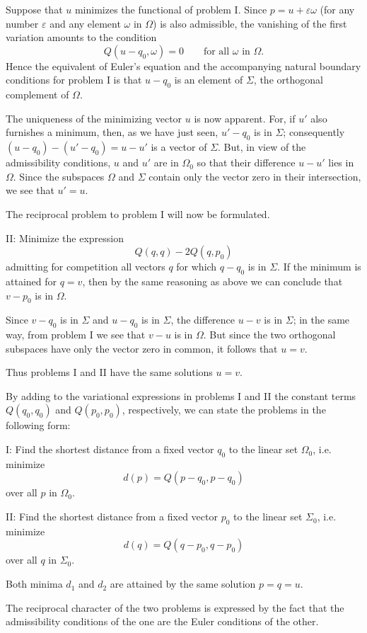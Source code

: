 Suppose that $u$ minimizes the functional of problem I. Since $p=u+\varepsilon\omega$ (for any number $\varepsilon$ and any element $\omega$ in $\Omega$) is also admissible, the vanishing of the first variation amounts to the condition
\[
Q(u-q_0,\omega)=0\qquad\text{for all }\omega\text{ in }\Omega.
\]
Hence the equivalent of Euler's equation and the accompanying natural boundary conditions for problem I is that $u-q_0$ is an element of $\Sigma$, the orthogonal complement of $\Omega$.

The uniqueness of the minimizing vector $u$ is now apparent. For, if $u'$ also furnishes a minimum, then, as we have just seen, $u'-q_0$ is in $\Sigma$; consequently $(u-q_0)-(u'-q_0)=u-u'$ is a vector of $\Sigma$. But, in view of the admissibility conditions, $u$ and $u'$ are in $\Omega_0$ so that their difference $u-u'$ lies in $\Omega$. Since the subspaces $\Omega$ and $\Sigma$ contain only the vector zero in their intersection, we see that $u'=u$.

The reciprocal problem to problem I will now be formulated.

II: Minimize the expression
\[
Q(q,q)-2Q(q,p_0)
\]
admitting for competition all vectors $q$ for which $q-q_0$ is in $\Sigma$. If the minimum is attained for $q=v$, then by the same reasoning as above we can conclude that $v-p_0$ is in $\Omega$.

Since $v-q_0$ is in $\Sigma$ and $u-q_0$ is in $\Sigma$, the difference $u-v$ is in $\Sigma$; in the same way, from problem I we see that $v-u$ is in $\Omega$. But since the two orthogonal subspaces have only the vector zero in common, it follows that $u=v$.

Thus problems I and II have the same solutions $u=v$.

By adding to the variational expressions in problems I and II the constant terms $Q(q_0,q_0)$ and $Q(p_0,p_0)$, respectively, we can state the problems in the following form:

I: Find the shortest distance from a fixed vector $q_0$ to the linear set $\Omega_0$, i.e. minimize
\[
d(p)=Q(p-q_0,p-q_0)
\]
over all $p$ in $\Omega_0$.

II: Find the shortest distance from a fixed vector $p_0$ to the linear set $\Sigma_0$, i.e. minimize
\[
d(q)=Q(q-p_0,q-p_0)
\]
over all $q$ in $\Sigma_0$.

Both minima $d_1$ and $d_2$ are attained by the same solution $p=q=u$.

The reciprocal character of the two problems is expressed by the fact that the admissibility conditions of the one are the Euler conditions of the other.

